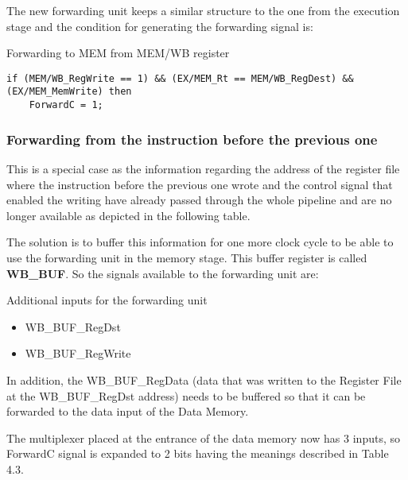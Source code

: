 \documentclass[a4paper,12pt]{report}
\begin{document}
The new forwarding unit keeps a similar structure to the one from the execution stage and the condition for generating the forwarding signal is:

\begin{my-listing}{Forwarding to MEM from MEM/WB register}
    \begin{lstlisting}[style=vhdl]
if (MEM/WB_RegWrite == 1) && (EX/MEM_Rt == MEM/WB_RegDest) && (EX/MEM_MemWrite) then
    ForwardC = 1;
    \end{lstlisting}
\end{my-listing}

\subsubsection{Forwarding from the instruction before the previous one}
This is a special case as the information regarding the address of the register file where the instruction before the previous one wrote and the control signal that enabled the writing have already passed through the whole pipeline and are no longer available as depicted in the following table.

The solution is to buffer this information for one more clock cycle to be able to use the forwarding unit in the memory stage. This buffer register is called \textbf{WB\_BUF}. So the signals available to the forwarding unit are:

\begin{my-list}{Additional inputs for the forwarding unit}
    \begin{itemize}
        \item WB\_BUF\_RegDst
        \item WB\_BUF\_RegWrite
    \end{itemize}
\end{my-list}

In addition, the WB\_BUF\_RegData (data that was written to the Register File at the WB\_BUF\_RegDst address) needs to be buffered so that it can be forwarded to the data input of the Data Memory.

The multiplexer placed at the entrance of the data memory now has 3 inputs, so ForwardC signal is expanded to 2 bits having the meanings described in Table 4.3.
\end{document}
